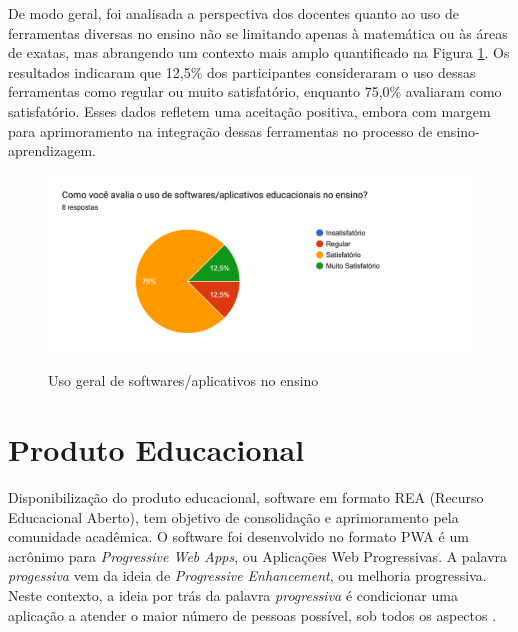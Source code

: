 

De modo geral, foi analisada a perspectiva dos docentes quanto ao uso de ferramentas diversas no ensino não se limitando apenas à matemática ou às áreas de exatas, mas abrangendo um contexto mais amplo quantificado na Figura \ref{fig:soft_app_ensino}. Os resultados indicaram que 12,5\% dos participantes consideraram o uso dessas ferramentas como regular ou muito satisfatório, enquanto 75,0\% avaliaram como satisfatório. Esses dados refletem uma aceitação positiva, embora com margem para aprimoramento na integração dessas ferramentas no processo de ensino-aprendizagem.

\begin{figure}[h!]
    \caption{Uso geral de softwares/aplicativos no ensino}
    \centering
    \includegraphics[scale=0.2]{figuras/resultados/app_ensino.png}
    \label{fig:soft_app_ensino}
\end{figure}








\section{Produto Educacional}
\label{produto_educacional}

Disponibilização do produto educacional, software em formato REA (Recurso Educacional Aberto), tem objetivo de consolidação e aprimoramento pela comunidade acadêmica. O software foi desenvolvido no formato PWA é um acrônimo para \textit{Progressive Web Apps}, ou Aplicações Web Progressivas. A palavra \textit{progessiva} vem da ideia de \textit{Progressive Enhancement}, ou melhoria progressiva. Neste contexto, a ideia por trás da palavra \textit{progressiva} é condicionar uma aplicação a atender o maior número de pessoas possível, sob todos os aspectos \cite{pontes2018progressive}.


